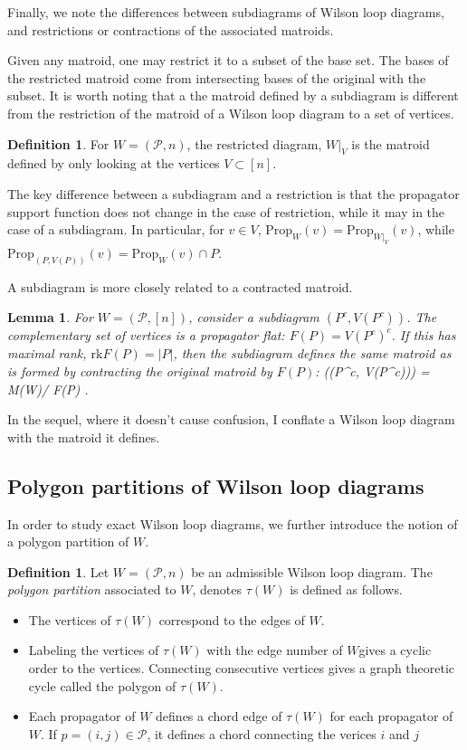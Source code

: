 \documentclass[11pt]{article}
\newcommand{\rk}{\textrm{rk}}
\def\bas #1\eas{\begin{align*} #1 \end{align*}}
\newcommand{\cP}{\mathcal{P}}
\newcommand{\Prop}{\textrm{Prop}}
\newtheorem{lem}[thm]{Lemma}
\theoremstyle{remark}
\theoremstyle{definition}
\newtheorem{dfn}[thm]{Definition}
\begin{document}
Finally, we note the differences between subdiagrams of Wilson loop diagrams, and restrictions or contractions of the associated matroids.

Given any matroid, one may restrict it to a subset of the base set. The bases of the restricted matroid come from intersecting bases of the original with the subset. It is worth noting that a the matroid defined by a subdiagram is different from the restriction of the matroid of a Wilson loop diagram to a set of vertices.

\begin{dfn} \label{restrictiondfn}
For $W = (\cP, n)$, the restricted diagram, $W|_V$ is the matroid defined by only looking at the vertices $V \subset [n]$.
\end{dfn}

The key difference between a subdiagram and a restriction is that the propagator support function does not change in the case of restriction, while it may in the case of a subdiagram. In particular, for $v \in V$, $\Prop_W(v) = \Prop_{W|_V}(v)$, while $\Prop_{(P, V(P))} (v) = \Prop_W(v) \cap P$.

A subdiagram is more closely related to a contracted matroid.

\begin{lem} \label{contractsubdiaglem}
For $W = (\cP, [n])$, consider a subdiagram $(P^c, V(P^c))$. The complementary set of vertices is a propagator flat: $F(P) = V(P^c)^c$. If this has maximal rank, $\rk F(P) = |P|$, then the subdiagram defines the same matroid as is formed by contracting the original matroid by $F(P)$: \bas M((P^c, V(P^c))) = M(W)/ F(P) \;. \eas
\end{lem}

In the sequel, where it doesn't cause confusion, I conflate a Wilson loop diagram with the matroid it defines.

\subsection{Polygon partitions of Wilson loop diagrams}

In order to study exact Wilson loop diagrams, we further introduce the notion of a polygon partition of $W$.

\begin{dfn}
  Let $W = (\cP, n)$ be an admissible Wilson loop diagram.  The \emph{polygon partition} associated to $W$, denotes $\tau(W)$ is defined as follows.
  \begin{itemize}
  \item The vertices of $\tau(W)$ correspond to the edges of $W$.
  \item Labeling the vertices of $\tau(W)$ with the edge number of $W$gives a cyclic order to the vertices. Connecting consecutive vertices gives a graph theoretic cycle called the polygon of $\tau(W)$.
  \item Each propagator of $W$ defines a chord edge of $\tau(W)$ for each propagator of $W$.  If $p= (i,j) \in \cP$, it defines a chord connecting the verices $i$ and $j$
  \end{itemize}
\end{dfn}
\end{document}

